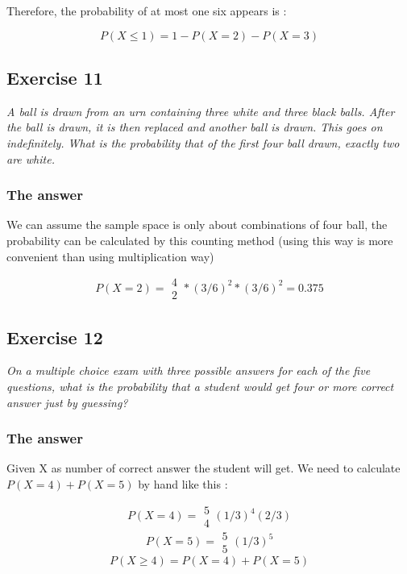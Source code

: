 \documentclass[12pt,a4paper]{article}
\begin{document}
Therefore, the probability of at most one six appears is :

\[
P(X\leq1) = 1 - P(X=2) - P(X=3)
\]

\subsection{Exercise 11}

\textit{A ball is drawn from an urn containing three white and three black balls. After the ball is drawn, it is then replaced and another ball is drawn. This goes on indefinitely. What is the probability that of the first four ball drawn, exactly two are white.}

\subsubsection{The answer}

We can assume the sample space is only about combinations of four ball, the probability can be calculated by this counting method (using this way is more convenient than using multiplication way)

\[
P(X=2) = \begin{array}{c}
4 \\
2
\end{array}
 * (3/6)^2 * (3/6)^2 = 0.375
\]


\subsection{Exercise 12}

\textit{On a multiple choice exam with three possible answers for each of the five questions, what is the probability that a student would get four or more correct answer just by guessing?}

\subsubsection{The answer}

Given X as number of correct answer the student will get. We need to calculate $P(X = 4) + P(X = 5)$ by hand like this :

\[
P(X = 4) = \begin{array}{c} 5 \\4 \end{array} (1/3)^4  (2/3)
\]
\[
P(X = 5) =  \begin{array}{c} 5 \\5 \end{array} (1/3)^5
\]
\[
P(X \geq 4) = P(X=4) + P(X=5)
\]
\end{document}
